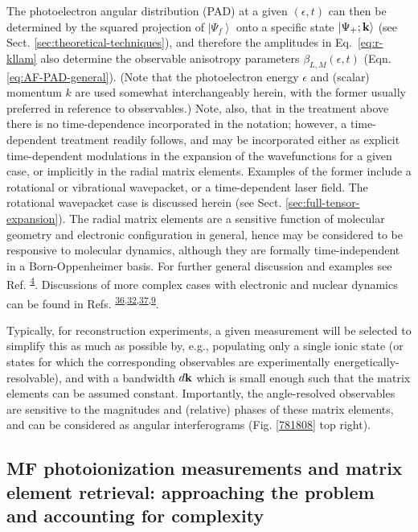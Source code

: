 \documentclass[10pt]{article}
\begin{document}
The photoelectron angular distribution (PAD) at a given $(\epsilon,t)$ can then be determined by the squared projection of $\left|\Psi_f\right>$ onto a specific state $\left|\Psi_{+};\bf{k}\right>$ (see Sect. \ref{sec:theoretical-techniques}), and therefore the amplitudes in Eq.~\ref{eq:r-kllam} also determine the observable anisotropy parameters $\beta_{L,M}(\epsilon,t)$ (Eqn. \ref{eq:AF-PAD-general}). (Note that the photoelectron energy $\epsilon$ and (scalar) momentum $k$ are used somewhat interchangeably herein, with the former usually preferred in reference to observables.) Note, also, that in the treatment above there is no time-dependence incorporated in the notation; however, a time-dependent treatment readily follows, and may be incorporated either as explicit time-dependent modulations in the expansion of the wavefunctions for a given case, or implicitly in the radial matrix elements. Examples of the former include a rotational or vibrational wavepacket, or a time-dependent laser field. The rotational wavepacket case is discussed herein (see Sect. \ref{sec:full-tensor-expansion}). The radial matrix elements are a sensitive function of molecular geometry and electronic configuration in general, hence may be considered to be responsive to molecular dynamics, although they are formally time-independent in a Born-Oppenheimer basis. For further general discussion and examples see Ref. \textsuperscript{\hyperref[csl:4]{4}}. Discussions of more complex cases with electronic and nuclear dynamics can be found in Refs.  \textsuperscript{\hyperref[csl:36]{36},\hyperref[csl:32]{32},\hyperref[csl:37]{37},\hyperref[csl:9]{9}}.

Typically, for reconstruction experiments, a given measurement will be selected to simplify this as much as possible by, e.g., populating only a single ionic state (or states for which the corresponding observables are experimentally energetically-resolvable), and with a bandwidth $d\bf{k}$ which is small enough such that the matrix elements can be assumed constant. Importantly, the angle-resolved observables are sensitive to the magnitudes and (relative) phases of these matrix elements, and can be considered as angular interferograms (Fig. \ref{781808} top right).


\subsection{MF photoionization measurements and matrix element retrieval: approaching the problem and accounting for complexity\label{sec:MF-recon-basic-intro}}
\end{document}

